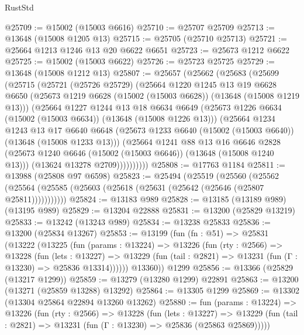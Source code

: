 \begin{lexlean}{RustStd}
\begin{coremodule}
@25709 := @15002 (@15003 @6616)
@25710 := @25707 @25709
@25713 := @13648 (@15008 @1205 @13)
@25715 := @25705 (@25710 @25713)
@25721 := @25664 @1213 @1246 @13 @20 @6622 @6651
@25723 := @25673 @1212 @6622
@25725 := @15002 (@15003 @6622)
@25726 := @25723 @25725
@25729 := @13648 (@15008 @1212 @13)
@25807 := @25657
    (@25662
      (@25683
        (@25699
          (@25715
            (@25721
              (@25726 @25729)
              (@25664
                @1220
                @1245
                @13
                @19
                @6628
                @6650
                (@25673 @1219 @6628 (@15002 (@15003 @6628)) (@13648 (@15008 @1219 @13)))
                (@25664
                  @1227
                  @1244
                  @13
                  @18
                  @6634
                  @6649
                  (@25673 @1226 @6634 (@15002 (@15003 @6634)) (@13648 (@15008 @1226 @13)))
                  (@25664
                    @1234
                    @1243
                    @13
                    @17
                    @6640
                    @6648
                    (@25673 @1233 @6640 (@15002 (@15003 @6640)) (@13648 (@15008 @1233 @13)))
                    (@25664
                      @1241
                      @88
                      @13
                      @16
                      @6646
                      @2828
                      (@25673 @1240 @6646 (@15002 (@15003 @6646)) (@13648 (@15008 @1240 @13)))
                      (@13624 @13278 @2709))))))))))
@25808 := @17763 @1184
@25811 := @13988 (@25808 @97 @6598)
@25823 := @25494
    (@25519
      (@25560
        (@25562 (@25564 (@25585 (@25603 (@25618 (@25631 (@25642 (@25646 (@25807 @25811)))))))))))
@25824 := @13183 @989
@25828 := @13185 (@13189 @989) (@13195 @989)
@25829 := @13204 @22888
@25831 := @13200 (@25829 @13219)
@25833 := @13242 (@13243 @989)
@25834 := @13238 @25833
@25836 := @13200 (@25834 @13267)
@25853 := @13199
    (fun (fn : @51) =>
    @25831
      (@13222
        (@13225
          (fun (params : @13224) =>
          @13226
            (fun (rty : @2566) =>
            @13228
              (fun (lets : @13227) =>
              @13229 (fun (tail : @2821) => @13231 (fun (Γ : @13230) => @25836 @13314))))))
        @13360))
    @1299
@25856 := @13366 (@25829 (@13217 @1299))
@25859 := @13279 (@13280 @1299) @22891
@25863 := @13200 (@13271 (@25859 @13288) @13292)
@25864 := @13305 @1299
@25869 := @13302 (@13304 @25864 @22894 @13260 @13262)
@25880 := fun (params : @13224) =>
  @13226
    (fun (rty : @2566) =>
    @13228
      (fun (lets : @13227) =>
      @13229 (fun (tail : @2821) => @13231 (fun (Γ : @13230) => @25836 (@25863 @25869)))))

\end{coremodule}
\end{lexlean}
